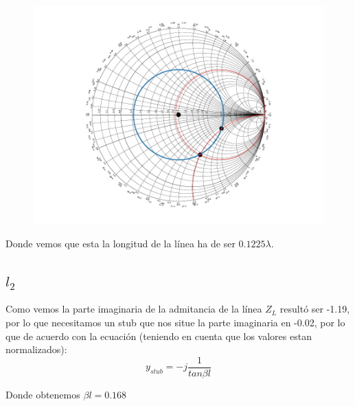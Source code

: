 \begin{figure}[h]
  \centering
  \includegraphics[scale = 0.75]{ej11/images/out2.pdf}
  \label{ej2smith}
\end{figure}

Donde vemos que esta la longitud de la línea ha de ser $0.1225\lambda$.

\subsection{$l_2$}
Como vemos la parte imaginaria de la admitancia de la línea $Z_L$ resultó ser -1.19, por lo que necesitamos un stub que nos situe la parte imaginaria en -0.02, por lo que de acuerdo con la ecuación (teniendo en cuenta que los valores estan normalizados):
\[y_{stub} = -j \frac{1}{tan{\beta l}} \]

Donde obtenemos $\beta l =   0.168$
